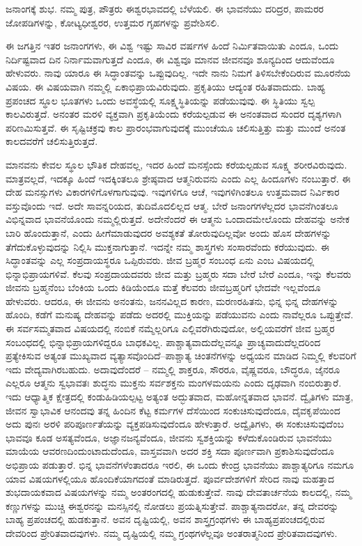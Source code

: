 ಜನಾಂಗಕ್ಕೆ ಶುಭ. ನಮ್ಮ ಪುತ್ರ, ಪೌತ್ರರು ಈಶ್ವರಭಾವದಲ್ಲಿ ಬೆಳೆಯಲಿ. ಈ ಭಾವನೆಯು ದರಿದ್ರರ, ಪಾಮರರ ಜೋಪಡಿಗಳನ್ನು, ಕೋಟ್ಯಧೀಶ್ವರರ, ಉತ್ತಮರ ಗೃಹಗಳನ್ನು ಪ್ರವೇಶಿಸಲಿ. 

ಈ ಜಗತ್ತಿನ ಇತರ ಜನಾಂಗಗಳು, ಈ ವಿಶ್ವ ಇಷ್ಟು ಸಾವಿರ ವರ್ಷಗಳ ಹಿಂದೆ ನಿರ್ಮಿತವಾಯಿತು ಎಂದೂ, ಒಂದು ನಿರ್ದಿಷ್ಟವಾದ ದಿನ ನಿರ್ನಾಮವಾಗುತ್ತದೆ ಎಂದೂ, ಈ ವಿಶ್ವವೂ ಮಾನವ ಜೀವನವೂ ಶೂನ್ಯದಿಂದ ಆದುವೆಂದೂ ಹೇಳುವರು. ನಾವು ಯಾರೂ ಈ ಸಿದ್ಧಾಂತವನ್ನು ಒಪ್ಪುವುದಿಲ್ಲ. ಇದೇ ನಾನು ನಿಮಗೆ ತಿಳಿಸಬೇಕೆಂದಿರುವ ಮೂರನೆಯ ವಿಷಯ. ಈ ವಿಷಯವಾಗಿ ನಮ್ಮಲ್ಲಿ ಏಕಾಭಿಪ್ರಾಯವಿರುವುದು. ಪ್ರಕೃತಿಯು ಆದ್ಯಂತ ರಹಿತವಾದುದು. ಬಾಹ್ಯ ಪ್ರಪಂಚದ ಸ್ಥೂಲ ಭೂತಗಳು ಒಂದು ಅವಸ್ಥೆಯಲ್ಲಿ ಸೂಕ್ಷ್ಮಸ್ಥಿತಿಯನ್ನು ಪಡೆಯುವುವು. ಈ ಸ್ಥಿತಿಯು ಸ್ವಲ್ಪ ಕಾಲವಿರುತ್ತದೆ. ಅನಂತರ ಮರಳಿ ವ್ಯಕ್ತವಾಗಿ ಪ್ರಕೃತಿಯೆಂದು ಕರೆಯಲ್ಪಡುವ ಈ ಅನಂತವಾದ ಸುಂದರ ದೃಶ್ಯಗಳಾಗಿ ಪರಿಣಮಿಸುತ್ತವೆ. ಈ ಸೃಷ್ಟಿಚಕ್ರವು ಕಾಲ ಪ್ರಾರಂಭವಾಗುವುದಕ್ಕೆ ಮುಂಚೆಯೂ ಚಲಿಸುತ್ತಿತ್ತು ಮತ್ತು ಮುಂದೆ ಅನಂತ ಕಾಲದವರೆಗೆ ಚಲಿಸುತ್ತಿರುತ್ತದೆ. 

ಮಾನವನು ಕೇವಲ ಸ್ಥೂಲ ಭೌತಿಕ ದೇಹವಲ್ಲ, ಇದರ ಹಿಂದೆ ಮನಸ್ಸೆಂದು ಕರೆಯಲ್ಪಡುವ ಸೂಕ್ಷ್ಮ ಶರೀರವಿರುವುದು. ಮಾತ್ರವಲ್ಲದೆ, ಇದಕ್ಕೂ ಹಿಂದೆ ಇದಕ್ಕಿಂತಲೂ ಶ್ರೇಷ್ಠವಾದ ಆತ್ಮನಿರುವನು ಎಂದು ಎಲ್ಲ ಹಿಂದೂಗಳು ನಂಬುತ್ತಾರೆ. ಈ ದೇಹ ಮನಸ್ಸುಗಳು ವಿಕಾರಗಳಿಗೊಳಗಾಗುವುವು. ಇವುಗಳಿಗೂ ಆಚೆ, ಇವುಗಳಿಗಿಂತಲೂ ಉತ್ತಮವಾದ ನಿರ್ವಿಕಾರ ವಸ್ತುವೊಂದು ಇದೆ. ಅದೇ ಸಾವನ್ನರಿಯದ, ತುದಿಮೊದಲಿಲ್ಲದ ಆತ್ಮ. ಬೇರೆ ಜನಾಂಗಗಳೆಲ್ಲದರ ಭಾವನೆಗಿಂತಲೂ ವಿಭಿನ್ನವಾದ ಭಾವನೆಯೊಂದು ನಮ್ಮಲ್ಲಿರುತ್ತದೆ. ಅದೇನೆಂದರೆ ಈ ಆತ್ಮನು ಒಂದಾದಮೇಲೊಂದು ದೇಹವನ್ನು ಅನೇಕ ಬಾರಿ ಹೊಂದುತ್ತಾನೆ, ಎಂದು ಹೀಗೆ\break ಮಾಡುವುದರ ಅವಶ್ಯಕತೆ ತೋರುವುದಿಲ್ಲವೋ ಅಂದು ಹೊಸ ದೇಹಗಳನ್ನು ತೆಗೆದುಕೊಳ್ಳುವುದನ್ನು ನಿಲ್ಲಿಸಿ ಮುಕ್ತನಾಗುತ್ತಾನೆ. ಇದನ್ನೇ ನಮ್ಮ ಶಾಸ್ತ್ರಗಳು ಸಂಸಾರವೆಂದು ಕರೆಯುವುದು. ಈ ಸಿದ್ಧಾಂತವನ್ನು ಎಲ್ಲ ಸಂಪ್ರದಾಯಸ್ಥರೂ ಒಪ್ಪಿರುವರು. ಜೀವ ಬ್ರಹ್ಮರ ಸಂಬಂಧ ಏನು ಎಂಬ ವಿಷಯದಲ್ಲಿ ಭಿನ್ನಾಭಿಪ್ರಾಯಗಳಿವೆ. ಕೆಲವು ಸಂಪ್ರದಾಯದವರು ಜೀವ ಮತ್ತು ಬ್ರಹ್ಮರು ಸದಾ ಬೇರೆ ಬೇರೆ ಎಂದೂ, ಇನ್ನು ಕೆಲವರು ಜೀವನು ಬ್ರಹ್ಮನೆಂಬ ಬೆಂಕಿಯ ಒಂದು ಕಿಡಿಯೆಂದೂ ಮತ್ತೆ ಕೆಲವರು ಜೀವಬ್ರಹ್ಮರಿಗೆ ಭೇದವೇ ಇಲ್ಲವೆಂದೂ ಹೇಳುವರು. ಆದರೂ, ಈ ಜೀವನು ಅನಂತನು, ಜನನವಿಲ್ಲದ ಕಾರಣ, ಮರಣರಹಿತನು, ಭಿನ್ನ ಭಿನ್ನ ದೇಹಗಳನ್ನು ಹೊಂದಿ, ಕಡೆಗೆ ಮನುಷ್ಯ ದೇಹವನ್ನು ಪಡೆದು ಅದರಲ್ಲಿ ಮುಕ್ತಿಯನ್ನು ಪಡೆಯುವನು ಎಂದು ನಾವೆಲ್ಲರೂ ಒಪ್ಪುತ್ತೇವೆ. ಈ ಸರ್ವಸಮ್ಮತವಾದ ವಿಷಯದಲ್ಲಿ ನಂಬಿಕೆ ನಮ್ಮೆಲ್ಲರಿಗೂ ಎಲ್ಲಿವರೆಗಿರುವುದೋ, ಅಲ್ಲಿಯವರೆಗೆ ಜೀವ ಬ್ರಹ್ಮರ ಸಂಬಂಧದಲ್ಲಿ ಭಿನ್ನಾಭಿಪ್ರಾಯಗಳಿದ್ದರೂ ಬಾಧಕವಿಲ್ಲ. ಪಾಶ್ಚಾತ್ಯವಾದುದೆಲ್ಲವನ್ನೂ ಪ್ರಾಚ್ಯವಾದುದೆಲ್ಲದರಿಂದ ಪ್ರತ್ಯೇಕಿಸುವ ಅತ್ಯಂತ ಮುಖ್ಯವಾದ ವ್ಯತ್ಯಾಸವೊಂದಿದೆ–ಪಾಶ್ಚಾತ್ಯ ಚಿಂತನೆಗಳನ್ನು ಅಧ್ಯಯನ ಮಾಡಿದ ನಿಮ್ಮಲ್ಲಿ ಕೆಲವರಿಗೆ ಇದು ವೇದ್ಯವಾಗಿರಬಹುದು. ಅದಾವುದೆಂದರೆ – ನಮ್ಮಲ್ಲಿ ಶಾಕ್ತರೂ, ಸೌರರೂ, ವೈಷ್ಣವರೂ, ಬೌದ್ಧರೂ, ಜೈನರೂ ಎಲ್ಲರೂ ಆತ್ಮನು ಸ್ವಭಾವತಃ ಶುದ್ಧನು ಮುಕ್ತನು ಸರ್ವಶಕ್ತನು ಮಂಗಳಮಯನು ಎಂದು ದೃಢವಾಗಿ ನಂಬಿರುತ್ತಾರೆ. ಇದು ಆಧ್ಯಾತ್ಮಿಕ ಕ್ಷೇತ್ರದಲ್ಲಿ ಕಂಡುಹಿಡಿಯಲ್ಪಟ್ಟ ಅತ್ಯಂತ ಅದ್ಭುತವಾದ, ಮಹೋನ್ನತವಾದ ಭಾವನೆ. ದ್ವೈತಿಗಳು ಮಾತ್ರ, ಜೀವನ ಸ್ವಾಭಾವಿಕ ಆನಂದವು ತನ್ನ ಹಿಂದಿನ ಕೆಟ್ಟ ಕರ್ಮಗಳ ದೆಸೆಯಿಂದ ಸಂಕುಚಿಸುವುದೆಂದೂ, ದೈವಕೃಪೆಯಿಂದ ಅದು ಪುನಃ ಅರಳಿ ಪರಿಪೂರ್ಣತೆಯನ್ನು ವ್ಯಕ್ತಪಡಿಸುವುದೆಂದೂ ಹೇಳುತ್ತಾರೆ. ಅದ್ವೈತಿಗಳು, ಈ ಸಂಕುಚಿಸುವುದೆಂಬ ಭಾವವೂ ಕೂಡ ಅಸತ್ಯವೆಂದೂ, ಅಜ್ಞಾನಜನ್ಯವೆಂದೂ, ಜೀವನು ಸ್ವಶಕ್ತಿಯನ್ನು ಕಳೆದುಕೊಂಡಿರುವ ಭಾವನೆಯು ಮಾಯೆಯ ಆವರಣದಿಂದುಂಟಾದುದೆಂದೂ, ವಾಸ್ತವವಾಗಿ ಅದರ ಶಕ್ತಿ ಸದಾ ಪೂರ್ಣವಾಗಿ ಪ್ರಕಾಶಿಸುವುದೆಂದೂ ಅಭಿಪ್ರಾಯ ಪಡುತ್ತಾರೆ. ಭಿನ್ನ ಭಾವನೆಗಳೆಂತಾದರೂ ಇರಲಿ, ಈ ಒಂದು ಕೇಂದ್ರ ಭಾವನೆಯು ಪಾಶ್ಚಾತ್ಯರಿಗೂ ನಮಗೂ ಯಾವ ವಿಷಯಗಳಲ್ಲಿಯೂ ಹೊಂದಿಕೆಯಾಗದಂತೆ ಮಾಡಿರುತ್ತದೆ. ಪೂರ್ವದೇಶಗಳಿಗೆ ಸೇರಿದ ನಾವು ಮಹತ್ತಾದ ಶುಭದಾಯಕವಾದ ವಿಷಯಗಳನ್ನು ನಮ್ಮ ಅಂತರಂಗದಲ್ಲಿ ಹುಡುಕುತ್ತೇವೆ. ನಾವು ದೇವತಾರ್ಚನೆಯ ಕಾಲದಲ್ಲಿ, ನಮ್ಮ ಕಣ್ಣುಗಳನ್ನು ಮುಚ್ಚಿ ಈಶ್ವರನನ್ನು ಮನಸ್ಸಿನಲ್ಲಿ ನೋಡಲು ಪ್ರಯತ್ನಿಸುತ್ತೇವೆ. ಪಾಶ್ಚಾತ್ಯನಾದರೋ, ತನ್ನ ದೇವರನ್ನು ಬಾಹ್ಯ ಪ್ರಪಂಚದಲ್ಲಿ ಹುಡಕುತ್ತಾನೆ. ಅವನ ದೃಷ್ಟಿಯಲ್ಲಿ, ಅವನ ಶಾಸ್ತ್ರಗ್ರಂಥಗಳು ಈ ಬಾಹ್ಯಪ್ರಪಂಚದಲ್ಲಿರುವ ದೇವರಿಂದ ಪ್ರೇರಿತವಾದವುಗಳು. ನಮ್ಮ ದೃಷ್ಟಿಯಲ್ಲಿ ನಮ್ಮ ಗ್ರಂಥಗಳೆಲ್ಲವೂ ಅಂತರಾತ್ಮನಿಂದ ಪ್ರೇರಿತವಾದವುಗಳು. 